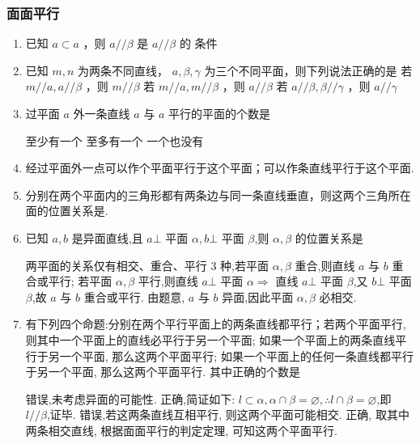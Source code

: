 \subsubsection*{面面平行}
\begin{enumerate}
    \item 已知 $ a \subset  a $ ，则 $ a//\beta $ 是 $ a//\beta $ 的 条件

    \item 已知 $ m,n $ 为两条不同直线， $ a,\beta,\gamma $ 为三个不同平面，则下列说法正确的是
     {若 $ m//a,a//\beta $ ，则 $ m//\beta $}
    {若 $ m//a,m//\beta $ ，则 $ a//\beta $} {若 $ a//\beta,\beta //\gamma $ ，则 $ a//\gamma $}

    \item 过平面 $ a $ 外一条直线 $ a $ 与 $ a $ 平行的平面的个数是 

     {至少有一个} {至多有一个} { 一个也没有}

    \item 经过平面外一点可以作个平面平行于这个平面；可以作条直线平行于这个平面.
    
    \item 分别在两个平面内的三角形都有两条边与同一条直线垂直，则这两个三角所在面的位置关系是.


    \item 已知 $a,b$ 是异面直线,且 $a\bot$ 平面 $\alpha,b\bot$ 平面 $\beta$,则 $\alpha,\beta$ 的位置关系是
    \begin{jieda}
        两平面的关系仅有相交、重合、平行 3 种,若平面 $\alpha,\beta$ 重合,则直线 $a$ 与 $b$ 重合或平行; 若平面 $\alpha,\beta$ 平行,则直线 $a \bot$ 平面 $\alpha  \Longrightarrow$ 直线 $a \bot$ 平面 $\beta$,又 $b \bot$ 平面 $\beta$,故 $a$ 与 $b$ 重合或平行. 由题意, $a$ 与 $b$ 异面,因此平面 $\alpha,\beta$ 必相交.
    \end{jieda}
    
    \item 有下列四个命题:分别在两个平行平面上的两条直线都平行；若两个平面平行,则其中一个平面上的直线必平行于另一个平面;  如果一个平面上的两条直线平行于另一个平面, 那么这两个平面平行; 如果一个平面上的任何一条直线都平行于另一个平面, 那么这两个平面平行. 其中正确的个数是
    \begin{jieda}
        错误,未考虑异面的可能性. 正确,简证如下: $l \subset  \alpha,\alpha  \cap  \beta  = \varnothing,\therefore l \cap  \beta  = \varnothing$,即 $l//\beta$,证毕. 错误,若这两条直线互相平行, 则这两个平面可能相交. 正确, 取其中两条相交直线, 根据面面平行的判定定理, 可知这两个平面平行.
    \end{jieda}
    

\end{enumerate}
